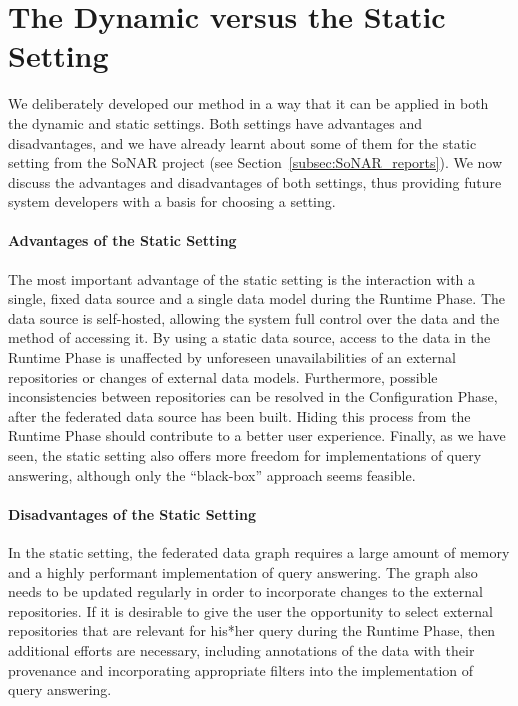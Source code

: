 \section{The Dynamic versus the Static Setting}
\label{sec:dynamic_vs_static}

We deliberately developed our method in a way that it can be applied
in both the dynamic and static settings.
Both settings have advantages and disadvantages,
and we have already learnt about some of them for the static setting
from the SoNAR project (see Section~\ref{subsec:SoNAR_reports}).
We now discuss the advantages and disadvantages of both settings,
thus providing future system developers with a basis for choosing a setting.

\paragraph{Advantages of the Static Setting}

The most important advantage of the static setting is the interaction with a single, fixed data source
and a single data model during the Runtime Phase.
The data source is self-hosted, allowing the system full control over the data
and the method of accessing it.
By using a static data source, access to the data in the Runtime Phase is
unaffected by unforeseen unavailabilities of an external repositories
or changes of external data models.
Furthermore, possible inconsistencies between repositories
can be resolved in the Configuration Phase, after the federated
data source has been built. Hiding this process from the Runtime Phase
should contribute to a better user experience.
Finally, as we have seen, the static setting also offers more freedom for implementations of
query answering, although only the \enquote{black-box} approach seems feasible.

\paragraph{Disadvantages of the Static Setting}

In the static setting, the federated data graph requires a large amount of memory
and a highly performant implementation of query answering.
The graph also needs to be updated regularly in order to incorporate changes
to the external repositories.
If it is desirable to give the user the opportunity to select external repositories 
that are relevant for his*her query during the Runtime Phase, 
then additional efforts are necessary, including annotations of the data
with their provenance and incorporating appropriate filters into the implementation
of query answering.

